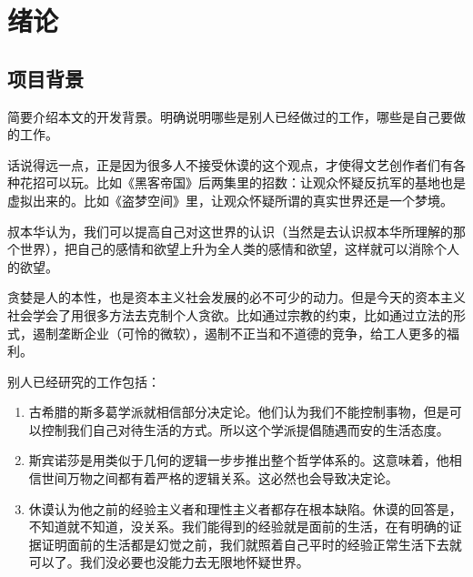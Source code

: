 
\clearpage
\setcounter{page}{1} 

\chapter{绪论}

\section{项目背景}\label{sec:background}
\zhengwen

简要介绍本文的开发背景。明确说明哪些是别人已经做过的工作，哪些是自己要做的工作。

话说得远一点，正是因为很多人不接受休谟的这个观点，才使得文艺创作者们有各种花招可以玩。比如《黑客帝国》后两集里的招数：让观众怀疑反抗军的基地也是虚拟出来的。比如《盗梦空间》里，让观众怀疑所谓的真实世界还是一个梦境。

叔本华认为，我们可以提高自己对这世界的认识（当然是去认识叔本华所理解的那个世界），把自己的感情和欲望上升为全人类的感情和欲望，这样就可以消除个人的欲望\cite{chen2005laser}。

贪婪是人的本性，也是资本主义社会发展的必不可少的动力。但是今天的资本主义社会学会了用很多方法去克制个人贪欲。比如通过宗教的约束，比如通过立法的形式，遏制垄断企业（可怜的微软），遏制不正当和不道德的竞争，给工人更多的福利\cite{chen2005laser, mittelbach2004latex, zhen2018leave}。

别人已经研究的工作包括：
\begin{enumerate}
	\item 古希腊的斯多葛学派就相信部分决定论。他们认为我们不能控制事物，但是可以控制我们自己对待生活的方式。所以这个学派提倡随遇而安的生活态度\cite{zhou2002nerualnet}。
	\item 斯宾诺莎是用类似于几何的逻辑一步步推出整个哲学体系的。这意味着，他相信世间万物之间都有着严格的逻辑关系。这必然也会导致决定论\cite{qi2020deeplearning}。
	\item 休谟认为他之前的经验主义者和理性主义者都存在根本缺陷。休谟的回答是，不知道就不知道，没关系。我们能得到的经验就是面前的生活，在有明确的证据证明面前的生活都是幻觉之前，我们就照着自己平时的经验正常生活下去就可以了。我们没必要也没能力去无限地怀疑世界\cite{partl2019short}。
\end{enumerate}

